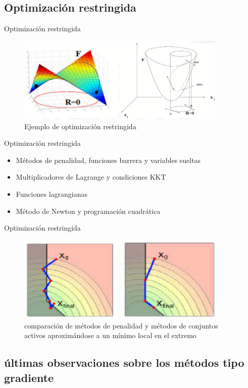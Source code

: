 \documentclass{beamer}
\begin{document}
    \subsection{Optimización restringida}
        \begin{frame}{Optimización restringida}
            \begin{figure}[h]
                \centering
                \captionsetup{justification=centering}
                \includegraphics[width=10cm]{Imagenes/Captura de pantalla 2024-03-09 160319.png}
                \caption{Ejemplo de optimización restringida}
                \centering
            \end{figure}
        \end{frame}
        \begin{frame}{Optimización restringida}
\begin{itemize}
    \item Métodos de penalidad, funciones barrera y variables sueltas
    \item Multiplicadores de Lagrange y condiciones KKT
    \item Funciones lagrangianas
    \item Método de Newton y programación cuadrática
\end{itemize}
        \end{frame}
        \begin{frame}{Optimización restringida}
            \begin{figure}[h]
                \centering
                \captionsetup{justification=centering}
                \includegraphics[width=10cm]{Imagenes/Captura de pantalla 2024-03-09 153248.png}
                \caption{comparación de métodos de penalidad y métodos de conjuntos activos 
                aproximándose a un mínimo local en el extremo}
                \centering
            \end{figure}
        \end{frame}
    \subsection{últimas observaciones sobre los métodos tipo gradiente}
        \begin{frame}
                
        \end{frame}
\end{document}
